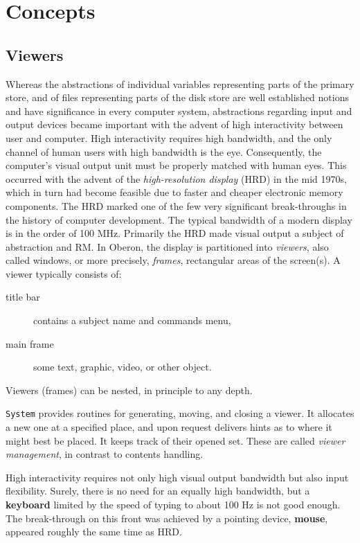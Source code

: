 \section{Concepts}
\subsection{Viewers}
Whereas the abstractions of individual variables representing parts of the primary store,
and of files representing parts of the disk store are well established notions and have
significance in every computer system, abstractions regarding input and output devices
became important with the advent of high interactivity between user and computer. High
interactivity requires high bandwidth, and the only channel of human users with high
bandwidth is the eye. Consequently, the computer's visual output unit must be properly
matched with human eyes. This occurred with the advent of the \emph{high-resolution
display} (HRD) in the mid 1970s, which in turn had become feasible due to faster and
cheaper electronic memory components. The HRD marked one of the few very significant
break-throughs in the history of computer development. The typical bandwidth of a modern
display is in the order of 100 MHz. Primarily the HRD made visual output a subject of
abstraction and RM. In Oberon, the display is partitioned into \emph{viewers}, also called
windows, or more precisely, \emph{frames}, rectangular areas of the screen(s). A viewer
typically consists of:
\begin{description}
  \item[title bar] contains a subject name and commands menu,
  \item[main frame] some text, graphic, video, or other object.
\end{description}
Viewers (frames) can be nested, in principle to any depth.

\verb|System| provides routines for generating, moving, and closing a viewer. It allocates
a new one at a specified place, and upon request delivers hints as to where it might best
be placed. It keeps track of their opened set. These are called \emph{viewer management},
in contrast to contents handling.

High interactivity requires not only high visual output bandwidth but also input flexibility.
Surely, there is no need for an equally high bandwidth, but a \textbf{keyboard} limited by
the speed of typing to about 100 Hz is not good enough. The break-through on this front was
achieved by a pointing device, \textbf{mouse}, appeared roughly the same time as HRD.

